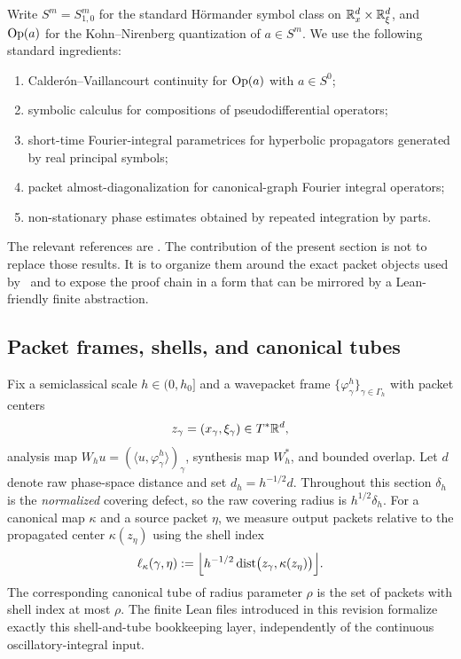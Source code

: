 Write $S^m=S^m_{1,0}$ for the standard H\"ormander symbol class on $\mathbb R^d_x\times\mathbb R^d_\xi$, and $\operatorname{Op}(a)$ for the Kohn--Nirenberg quantization of $a\in S^m$. We use the following standard ingredients:
\begin{enumerate}
\item Calder\'on--Vaillancourt continuity for $\operatorname{Op}(a)$ with $a\in S^0$;
\item symbolic calculus for compositions of pseudodifferential operators;
\item short-time Fourier-integral parametrices for hyperbolic propagators generated by real principal symbols;
\item packet almost-diagonalization for canonical-graph Fourier integral operators;
\item non-stationary phase estimates obtained by repeated integration by parts.
\end{enumerate}
The relevant references are \citet{hormander1985analysis3,hormander1985analysis4,zworski2012semiclassical,alazardmicrolocal,candesdemanet2005curvelet}. The contribution of the present section is not to replace those results. It is to organize them around the exact packet objects used by \MiNO\ and to expose the proof chain in a form that can be mirrored by a Lean-friendly finite abstraction.

\subsection{Packet frames, shells, and canonical tubes}

Fix a semiclassical scale $h\in(0,h_0]$ and a wavepacket frame $\{\varphi_\gamma^h\}_{\gamma\in\Gamma_h}$ with packet centers
\[
z_\gamma=(x_\gamma,\xi_\gamma)\in T^\ast\mathbb R^d,
\]
analysis map $W_hu=(\langle u,\varphi_\gamma^h\rangle)_\gamma$, synthesis map $W_h^\ast$, and bounded overlap.  Let $d$ denote raw phase-space distance and set $d_h=h^{-1/2}d$.  Throughout this section $\delta_h$ is the \emph{normalized} covering defect, so the raw covering radius is $h^{1/2}\delta_h$.  For a canonical map $\kappa$ and a source packet $\eta$, we measure output packets relative to the propagated center $\kappa(z_\eta)$ using the shell index
\[
\ell_\kappa(\gamma,\eta)
:=
\Bigl\lfloor h^{-1/2}\,\mathrm{dist}\bigl(z_\gamma,\kappa(z_\eta)\bigr)\Bigr\rfloor.
\]
The corresponding canonical tube of radius parameter $\rho$ is the set of packets with shell index at most $\rho$. The finite Lean files introduced in this revision formalize exactly this shell-and-tube bookkeeping layer, independently of the continuous oscillatory-integral input.

